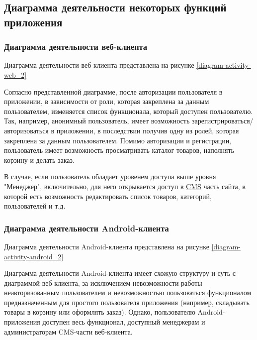 \subsection{Диаграмма деятельности некоторых функций приложения}\label{subsec:2-activity-diagram}\indent


\subsubsection{Диаграмма деятельности веб-клиента}\indent

Диаграмма деятельности веб-клиента представлена на рисунке \ref{diagram-activity-web_2}
\clearpage
\begin{sidewaysfigure}

\end{sidewaysfigure}
\clearpage

Согласно представленной диаграмме, после авторизации пользователя в приложении, в зависимости от роли, которая закреплена за данным пользователем, изменяется список функционала, 
который доступен пользователю.
Так, например, анонимный пользователь, имеет возможность зарегистрироваться/авторизоваться в приложении, в последствии получив одну из ролей, которая закреплена за данным пользователем.
Помимо авторизации и регистрации, пользователь имеет возможность просматривать каталог товаров, наполнять корзину и делать заказ.

В случае, если пользователь обладает уровенем доступа выше уровня "Менеджер", включительно, для него открывается доступ в \hyperlink{gloss:cms}{CMS} часть сайта, 
в которой есть возможность редактировать список товаров, категорий, пользователей и т.д.


\subsubsection{Диаграмма деятельности Android-клиента}\indent

Диаграмма деятельности Android-клиента представлена на рисунке \ref{diagram-activity-android_2}

\clearpage
\begin{sidewaysfigure}

\end{sidewaysfigure}
\clearpage

Диаграмма деятельности Android-клиента имеет схожую структуру и суть с диаграммой веб-клиента, за исключением невозможности работы неавторизованным пользователем 
и невозможностью пользоваться функционалом предназначенным для простого пользователя приложения (например, складывать товары в корзину или оформлять заказ). 
Однако, пользователю Android-приложения доступен весь функционал, доступный менеджерам и администраторам CMS-части веб-клиента. 
